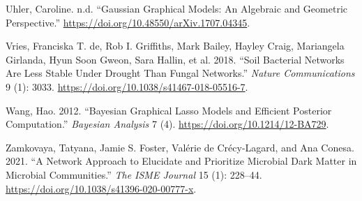 \documentclass[
  letterpaper,
  DIV=11,
  numbers=noendperiod]{scrartcl}
\newlength{\cslhangindent}
\newlength{\cslentryspacingunit} %
\newenvironment{CSLReferences}[2] %
 {%
  \setlength{\parindent}{0pt}
  \ifodd #1
  \let\oldpar\par
  \def\par{\hangindent=\cslhangindent\oldpar}
  \fi
  \setlength{\parskip}{#2\cslentryspacingunit}
 }%
 {}
\begin{document}
\begin{CSLReferences}{1}{0}
\leavevmode{}%
Uhler, Caroline. n.d. {``Gaussian Graphical Models: An Algebraic and
Geometric Perspective.''}
\url{https://doi.org/10.48550/arXiv.1707.04345}.

\leavevmode{}%
Vries, Franciska T. de, Rob I. Griffiths, Mark Bailey, Hayley Craig,
Mariangela Girlanda, Hyun Soon Gweon, Sara Hallin, et al. 2018. {``Soil
Bacterial Networks Are Less Stable Under Drought Than Fungal
Networks.''} \emph{Nature Communications} 9 (1): 3033.
\url{https://doi.org/10.1038/s41467-018-05516-7}.

\leavevmode{}%
Wang, Hao. 2012. {``Bayesian Graphical Lasso Models and Efficient
Posterior Computation.''} \emph{Bayesian Analysis} 7 (4).
\url{https://doi.org/10.1214/12-BA729}.

\leavevmode{}%
Zamkovaya, Tatyana, Jamie S. Foster, Valérie de Crécy-Lagard, and Ana
Conesa. 2021. {``A Network Approach to Elucidate and Prioritize
Microbial Dark Matter in Microbial Communities.''} \emph{The ISME
Journal} 15 (1): 228--44.
\url{https://doi.org/10.1038/s41396-020-00777-x}.

\end{CSLReferences}
\end{document}
